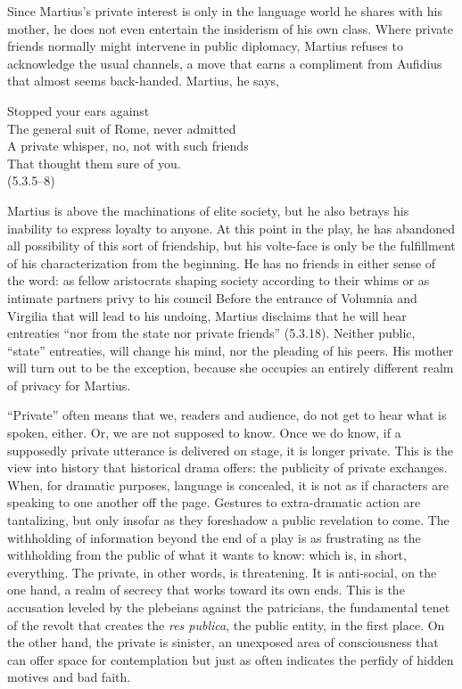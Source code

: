 Since Martius's private interest is only in the language world he shares with his mother, he does not even entertain the insiderism of his own class.
Where private friends normally might intervene in public diplomacy, Martius refuses to acknowledge the usual channels, a move that earns a compliment from Aufidius that almost seems back-handed.
Martius, he says,
\begin{vq}
Stopped your ears against\\
The general suit of Rome, never admitted\\
A private whisper, no, not with such friends\\
That thought them sure of you.\\
\hfill(5.3.5--8)
\end{vq}
Martius is above the machinations of elite society, but he also betrays his inability to express loyalty to anyone.
At this point in the play, he has abandoned all possibility of this sort of friendship, but his volte-face is only be the fulfillment of his characterization from the beginning.
He has no friends in either sense of the word: as fellow aristocrats shaping society according to their whims or as intimate partners privy to his council
Before the entrance of Volumnia and Virgilia that will lead to his undoing, Martius disclaims that he will hear entreaties ``nor from the state nor private friends'' (5.3.18).
Neither public, ``state'' entreaties, will change his mind, nor the pleading of his peers.
His mother will turn out to be the exception, because she occupies an entirely different realm of privacy for Martius.

``Private'' often means that we, readers and audience, do not get to hear what is spoken, either.
Or, we are not supposed to know.
Once we do know, if a supposedly private utterance is delivered on stage, it is longer private.
This is the view into history that historical drama offers: the publicity of private exchanges.
When, for dramatic purposes, language is concealed, it is not as if characters are speaking to one another off the page.
Gestures to extra-dramatic action are tantalizing, but only insofar as they foreshadow a public revelation to come.
The withholding of information beyond the end of a play is as frustrating as the withholding from the public of what it wants to know: which is, in short, everything.
The private, in other words, is threatening.
It is anti-social, on the one hand, a realm of secrecy that works toward its own ends.
This is the accusation leveled by the plebeians against the patricians, the fundamental tenet of the revolt that creates the \emph{res publica}, the public entity, in the first place.
On the other hand, the private is sinister, an unexposed area of consciousness that can offer space for contemplation but just as often indicates the perfidy of hidden motives and bad faith.

